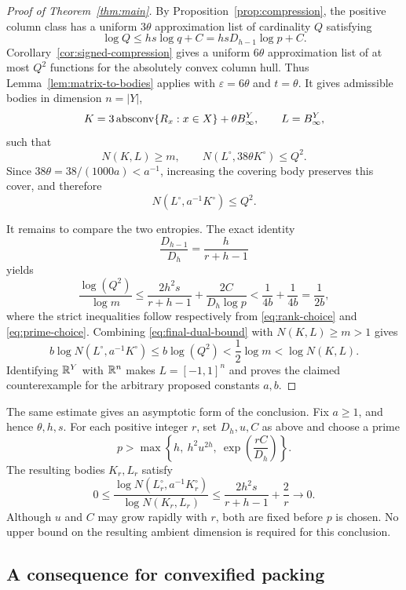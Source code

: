 \begin{proof}[Proof of Theorem~\ref{thm:main}]
By Proposition~\ref{prop:compression}, the positive column class has
a uniform $3\theta$ approximation list of cardinality $Q$ satisfying
\[
 \log Q\le hs\log q+C
         =hsD_{h-1}\log p+C.
\]
Corollary~\ref{cor:signed-compression} gives a uniform $6\theta$
approximation list of at most $Q^2$ functions for the absolutely
convex column hull.  Thus Lemma~\ref{lem:matrix-to-bodies} applies
with $\varepsilon=6\theta$ and $t=\theta$.  It gives admissible
bodies in dimension $n=|Y|$,
\begin{equation}
\label{eq:final-bodies}
 K=3\operatorname{absconv}\{R_x:x\in X\}+\theta B_\infty^Y,
 \qquad L=B_\infty^Y,
\end{equation}
such that
\[
 N(K,L)\ge m,
 \qquad N(L^\circ,38\theta K^\circ)\le Q^2.
\]
Since $38\theta=38/(1000a)<a^{-1}$, increasing the covering body
preserves this cover, and therefore
\begin{equation}
\label{eq:final-dual-bound}
 N(L^\circ,a^{-1}K^\circ)\le Q^2.
\end{equation}

It remains to compare the two entropies.  The exact identity
\[
 \frac{D_{h-1}}{D_h}=\frac{h}{r+h-1}
\]
yields
\begin{equation}
\label{eq:entropy-ratio}
 \frac{\log(Q^2)}{\log m}
 \le \frac{2h^2s}{r+h-1}
      +\frac{2C}{D_h\log p}
 <\frac1{4b}+\frac1{4b}
 =\frac1{2b},
\end{equation}
where the strict inequalities follow respectively from
\eqref{eq:rank-choice} and \eqref{eq:prime-choice}.
Combining \eqref{eq:final-dual-bound} with $N(K,L)\ge m>1$ gives
\[
 b\log N(L^\circ,a^{-1}K^\circ)
 \le b\log(Q^2)
 <\frac12\log m
 <\log N(K,L).
\]
Identifying $\mathbb R^Y$ with $\mathbb R^n$ makes $L=[-1,1]^n$ and proves the
claimed counterexample for the arbitrary proposed constants $a,b$.
\end{proof}

The same estimate gives an asymptotic form of the conclusion.  Fix
$a\ge1$, and hence $\theta,h,s$.  For each positive integer $r$, set
$D_h,u,C$ as above and choose a prime
\[
 p>\max\left\{h,\ h^2u^{2h},\ \exp\left(\frac{rC}{D_h}\right)
        \right\}.
\]
The resulting bodies $K_r,L_r$ satisfy
\[
 0\le
 \frac{\log N(L_r^\circ,a^{-1}K_r^\circ)}
      {\log N(K_r,L_r)}
 \le \frac{2h^2s}{r+h-1}+\frac2r
 \longrightarrow0.
\]
Although $u$ and $C$ may grow rapidly with $r$, both are fixed before
$p$ is chosen.  No upper bound on the resulting ambient dimension is
required for this conclusion.

\subsection{A consequence for convexified packing}

